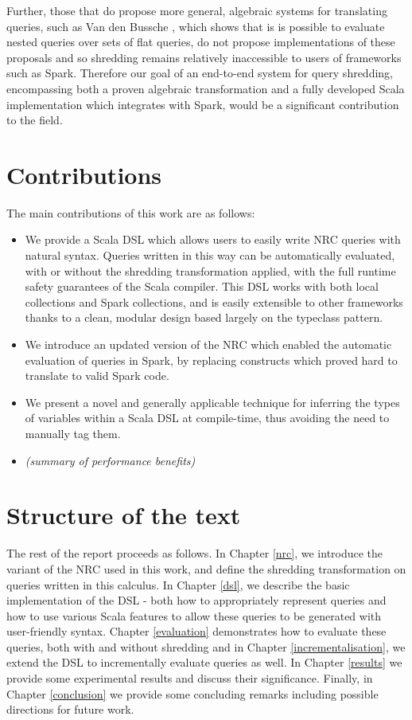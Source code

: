 {{Further, those that do propose more general, algebraic systems for translating queries, such as Van den Bussche \cite{van2001simulation}, which shows that is is possible to evaluate nested queries over sets of flat queries, do not propose implementations of these proposals and so shredding remains relatively inaccessible to users of frameworks such as Spark. Therefore our goal of an end-to-end system for query shredding, encompassing both a proven algebraic transformation and a fully developed Scala implementation which integrates with Spark, would be a significant contribution to the field.		
}



}


\section{Contributions} {
The main contributions of this work are as follows:

\begin{itemize}
\item{We provide a Scala DSL which allows users to easily write NRC queries with natural syntax. Queries written in this way can be automatically evaluated, with or without the shredding transformation applied, with the full runtime safety guarantees of the Scala compiler. This DSL works with both local collections and Spark collections, and is easily extensible to other frameworks thanks to a clean, modular design based largely on the typeclass pattern.}
\item{We introduce an updated version of the NRC which enabled the automatic evaluation of queries in Spark, by replacing constructs which proved hard to translate to valid Spark code.}
\item{We present a novel and generally applicable technique for inferring the types of variables within a Scala DSL at compile-time, thus avoiding the need to manually tag them. }
\item{\textit{(summary of performance benefits)}}
\end{itemize}
}

\section{Structure of the text} {
The rest of the report proceeds as follows. In Chapter \ref{nrc}, we introduce the variant of the NRC used in this work, and define the shredding transformation on queries written in this calculus. In Chapter \ref{dsl}, we describe the basic implementation of the DSL - both how to appropriately represent queries and how to use various Scala features to allow these queries to be generated with user-friendly syntax. Chapter \ref{evaluation} demonstrates how to evaluate these queries, both with and without shredding and in Chapter \ref{incrementalisation}, we extend the DSL to incrementally evaluate queries as well. In Chapter \ref{results} we provide some experimental results and discuss their significance. Finally, in Chapter \ref{conclusion} we provide some concluding remarks including possible directions for future work.
}